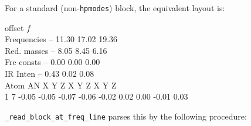 \documentclass[10pt,a4paper,twoside]{article}
\newcommand{\fn}[1]{\texttt{#1}}
\begin{document}
For a standard (non-\fn{hpmodes}) block, the equivalent layout is:

\begin{bytebox}
\hspace*{0.5em}offset $f$\\
                  Frequencies --    11.30   17.02   19.36\\
                  Red. masses --     8.05    8.45    6.16\\
                  Frc consts  --     0.00    0.00    0.00\\
                  IR Inten    --     0.43    0.02    0.08\\
 Atom AN      X      Y      Z       X      Y      Z       X      Y      Z\\
   1   7    -0.05  -0.05  -0.07    -0.06  -0.02   0.02    0.00  -0.01   0.03\\
\end{bytebox}

\fn{\_read\_block\_at\_freq\_line} parses this by the following procedure:
\end{document}
